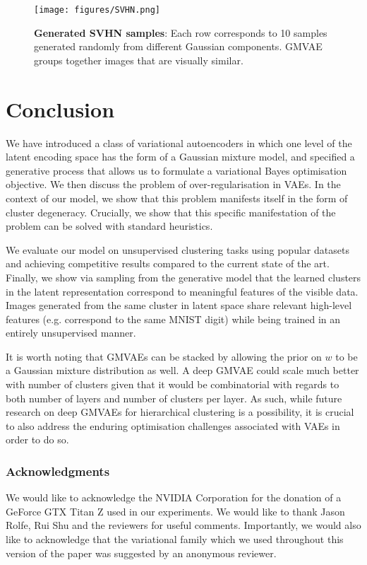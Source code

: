 \documentclass{article} \usepackage{iclr2017_conference,times}
\begin{document}
\begin{figure}[h]
\centering
\texttt{[image: figures/SVHN.png]}
 \caption{\textbf{Generated SVHN samples}: Each row corresponds to 10 samples generated randomly from different Gaussian components. GMVAE groups together images that are visually similar.}
\label{fig:SVHN}
\end{figure}

\section{Conclusion}

We have introduced a class of variational autoencoders in which one level of the latent encoding space has the form of a Gaussian mixture model, and specified a generative process that allows us to formulate a variational Bayes optimisation objective. We then discuss the problem of over-regularisation in VAEs. In the context of our model, we show that this problem manifests itself in the form of cluster degeneracy. Crucially, we show that this specific manifestation of the problem can be solved with standard heuristics. 

We evaluate our model on unsupervised clustering tasks using popular datasets and achieving competitive results compared to the current state of the art. Finally, we show via sampling from the generative model that the learned clusters in the latent representation correspond to meaningful features of the visible data. Images generated from the same cluster in latent space share relevant high-level features (e.g. correspond to the same MNIST digit) while being trained in an entirely unsupervised manner.

It is worth noting that GMVAEs can be stacked by allowing the prior on $w$ to be a Gaussian mixture distribution as well. A deep GMVAE could scale much better with number of clusters given that it would be combinatorial with regards to both number of layers and number of clusters per layer. As such, while future research on deep GMVAEs for hierarchical clustering is a possibility, it is crucial to also address the enduring optimisation challenges associated with VAEs in order to do so.

\subsubsection*{Acknowledgments}
We would like to acknowledge the NVIDIA Corporation for the donation of a GeForce GTX Titan Z used in our experiments. We would like to thank Jason Rolfe, Rui Shu and the reviewers for useful comments. Importantly, we would also like to acknowledge that the variational family which we used throughout this version of the paper was suggested by an anonymous reviewer. 
\end{document}
